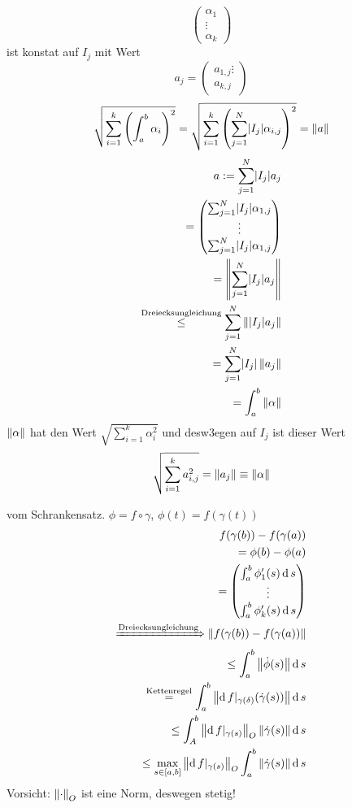 \begin{Bew}
\[\begin{pmatrix}
    \alpha_1\\ \vdots \\ \alpha_k
  \end{pmatrix}\]
  ist konstat auf $I_j$ mit Wert
  \[a_j = \begin{pmatrix}
    a_{1,j} \vdots \\ a_{k,j}
  \end{pmatrix}\]
  \[\sqrt{\sum_{i=1}^k\left( \int_a^b\alpha_i \right)^2}=\sqrt{\sum_{i=1}^k\left( \sum_{j=1}^N\mathopen| I_j \mathclose|\alpha_{i,j} \right)^2}=\left\| a \right\|\]
  \begin{eqnarray*}
    a:=\sum_{j=1}^N\mathopen| I_j \mathclose|a_j\\
    = \begin{pmatrix}
      \sum_{j=1}^N\mathopen| I_j \mathclose|\alpha_{1,j}\\
      \vdots \\
      \sum_{j=1}^N\mathopen| I_j \mathclose|\alpha_{1,j}\\
    \end{pmatrix}\\
    = \left\| \sum_{j=1}^N\mathopen| I_j \mathclose|a_j \right\|\\
    \stackrel{\text{Dreiecksungleichung}}{\leq}\sum_{j=1}^N\left\| \mathopen| I_j \mathclose|a_j \right\|\\
    =\sum_{j=1}^N\mathopen| I_j \mathclose|\left\| a_j \right\|\\
    =\int_a^b\left\| \alpha \right\|
  \end{eqnarray*}
  $\left\| \alpha \right\|$ hat den Wert $\sqrt{\sum_{i=1}^k\alpha_i^2}$ und desw3egen auf $I_j$ ist dieser Wert
  \[\sqrt{\sum^k_{i=1}a_{i,j}^2}=\left\| a_j \right\|\equiv\left\| \alpha \right\|\]
\end{Bew}
\begin{Bew}
  vom Schrankensatz. $\phi=f\circ \gamma$, $\phi(t)=f(\gamma(t))$
  \begin{eqnarray*}
    f(\gamma(b))-f(\gamma(a))\\
    =\phi(b)-\phi(a)\\
    = \begin{pmatrix}
      \int_a^b\phi_1'(s)\operatorname{d} s\\
      \vdots \\
      \int_a^b\phi_k'(s)\operatorname{d} s\\
    \end{pmatrix}\\
    \xRightarrow{\text{Dreiecksungleichung}}\left\| f(\gamma(b))-f(\gamma(a)) \right\|\\
    \leq \int_a^b\left\| \dot\phi(s) \right\|\operatorname{d} s\\
    \stackrel{\text{Kettenregel}}{=}\int_a^b\left\| \operatorname{d} f|_{\gamma(\delta)}(\dot\gamma(s)) \right\|\operatorname{d} s\\
    \leq \int_A^b\left\| \operatorname{d} f|_{\gamma(s)} \right\|_O\left\| \dot\gamma(s) \right\|\operatorname{d} s\\
    \leq \max_{s\in [a,b]}\left\| \operatorname{d} f|_{\gamma(s)} \right\|_O\int_a^b\left\| \dot\gamma(s) \right\|\operatorname{d} s
  \end{eqnarray*}
  Vorsicht: $\left\| \cdot \right\|_O$ ist eine Norm, deswegen stetig!
\end{Bew}
